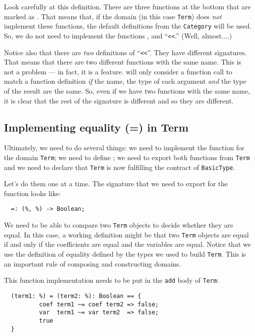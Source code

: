 Look carefully at this definition. There are three functions at the bottom
that are marked as . That means that, if the domain (in this
case \verb"Term") does {\em not\/} implement these functions, the default definitions
from the \verb"Category" will be used. So, we do not need to implement the
functions \ttin{\~{}=},  and ``\verb+<<+.'' (Well, almost....) 

Notice also that there are {\em two} definitions of ``\verb+<<+''. 
They have different signatures. 
That means that there are two different functions with the
same name. This is not a problem --- in fact, it is a feature. \asharp{} will
only consider a function call to match a function definition {\em if} the
name, the type of each argument {\em and} the type of the result are the same.
So, even if we have two functions with the same name, it is clear that the
rest of the signature is different and so they are different.

\subsection{Implementing equality (=) in Term}

Ultimately, we need to do several things: we need to implement the \ttin{=}
function for the domain \verb"Term"; we need to define ;
we need to export both functions from \verb"Term" and we need to declare that
\verb"Term" is now fulfilling the contract of \verb"BasicType".

Let's do them one at a time. The signature that we need to export for the
function \ttin{=} looks like:

\begin{small}
\begin{verbatim}
  =: (%, %) -> Boolean;
\end{verbatim}
\end{small}

We need to be able to compare two \verb"Term" objects to decide whether they 
are equal. In this case, a working definition might be that two \verb"Term"
objects are equal if and only if the coefficients are equal and the
variables are equal. Notice that we use the definition of equality
defined by the types we used to build \verb"Term". This is an important rule
of composing and constructing domains.

This function implementation needs to be put in the \verb"add" body
of \verb"Term":

\begin{small}
\begin{verbatim}
  (term1: %) = (term2: %): Boolean == {
          coef term1 ~= coef term2 => false;
          var  term1 ~= var term2  => false;
          true
  }
\end{verbatim}
\end{small}

